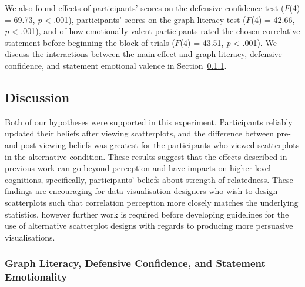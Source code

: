 \documentclass[sigconf]{acmart}
\begin{document}
We also found effects of participants' scores on the defensive
confidence test (\(F\)(4) = 69.73, \emph{p} \textless{} .001),
participants' scores on the graph literacy test (\(F\)(4) = 42.66,
\emph{p} \textless{} .001), and of how emotionally valent participants
rated the chosen correlative statement before beginning the block of
trials (\(F\)(4) = 43.51, \emph{p} \textless{} .001). We discuss the
interactions between the main effect and graph literacy, defensive
confidence, and statement emotional valence in
Section~\ref{sec-add-analyses-discussion}.

\subsection{Discussion}\label{sec-main-discussion}

Both of our hypotheses were supported in this experiment. Participants
reliably updated their beliefs after viewing scatterplots, and the
difference between pre- and post-viewing beliefs was greatest for the
participants who viewed scatterplots in the alternative condition. These
results suggest that the effects described in previous work can go
beyond perception and have impacts on higher-level cognitions,
specifically, participants' beliefs about strength of relatedness. These
findings are encouraging for data visualisation designers who wish to
design scatterplots such that correlation perception more closely
matches the underlying statistics, however further work is required
before developing guidelines for the use of alternative scatterplot
designs with regards to producing more persuasive visualisations.

\subsubsection{Graph Literacy, Defensive Confidence, and Statement
Emotionality}\label{sec-add-analyses-discussion}
\end{document}
